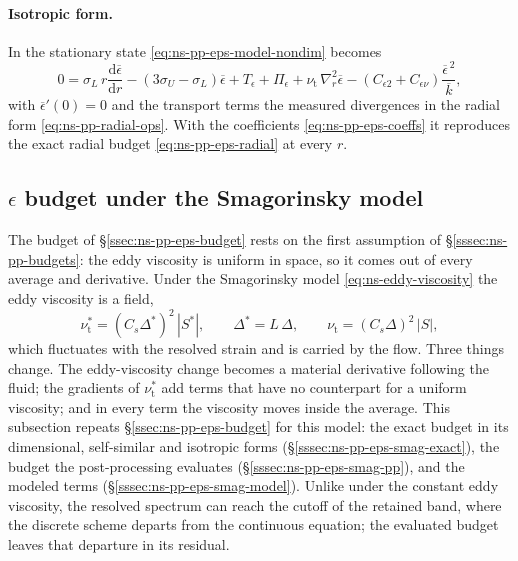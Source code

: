 \documentclass{article}
\begin{document}
\paragraph{Isotropic form.}
In the stationary state \eqref{eq:ns-pp-eps-model-nondim} becomes
\begin{equation}\label{eq:ns-pp-eps-model-stationary}
  0 = \sigma_L\, r \frac{\mathrm{d} \overline{\epsilon}}{\mathrm{d} r}
  - \left( 3\sigma_U - \sigma_L \right) \overline{\epsilon}
  + T_\epsilon + \Pi_\epsilon
  + \nu_{\mathrm{t}}\, \nabla_r^2 \overline{\epsilon}
  - \left( C_{\epsilon 2} + C_{\epsilon\nu} \right) \frac{\overline{\epsilon}^{\,2}}{\overline{k}} ,
\end{equation}
with $\overline{\epsilon}'(0) = 0$ and the transport terms the measured
divergences in the radial form \eqref{eq:ns-pp-radial-ops}. With the
coefficients \eqref{eq:ns-pp-eps-coeffs} it reproduces the exact radial
budget \eqref{eq:ns-pp-eps-radial} at every $r$.

\subsection{\texorpdfstring{$\epsilon$}{epsilon} budget under the Smagorinsky model}\label{ssec:ns-pp-eps-smag}
The budget of \S\ref{ssec:ns-pp-eps-budget} rests on the first assumption of
\S\ref{sssec:ns-pp-budgets}: the eddy viscosity is uniform in space, so it
comes out of every average and derivative. Under the Smagorinsky model
\eqref{eq:ns-eddy-viscosity} the eddy viscosity is a field,
\begin{equation}\label{eq:ns-pp-smag-nut}
  \nu_{\mathrm{t}}^* = (C_s \Delta^*)^2\, |S^*| ,
  \qquad
  \Delta^* = L\, \Delta ,
  \qquad
  \nu_{\mathrm{t}} = (C_s \Delta)^2\, |S| ,
\end{equation}
which fluctuates with the resolved strain and is carried by the flow. Three
things change. The eddy-viscosity change becomes a material derivative
following the fluid; the gradients of $\nu_{\mathrm{t}}^*$ add terms that have
no counterpart for a uniform viscosity; and in every term the viscosity moves
inside the average. This subsection repeats \S\ref{ssec:ns-pp-eps-budget} for
this model: the exact budget in its dimensional, self-similar and isotropic
forms (\S\ref{sssec:ns-pp-eps-smag-exact}), the budget the post-processing
evaluates (\S\ref{sssec:ns-pp-eps-smag-pp}), and the modeled terms
(\S\ref{sssec:ns-pp-eps-smag-model}). Unlike under the constant eddy
viscosity, the resolved spectrum can reach the cutoff of the retained band,
where the discrete scheme departs from the continuous equation; the evaluated
budget leaves that departure in its residual.
\end{document}

